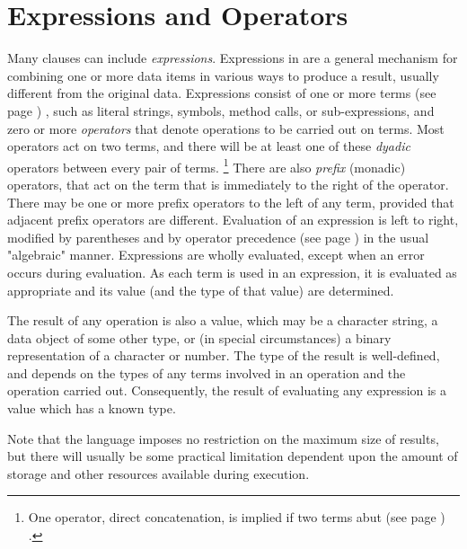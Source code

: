 \chapter{Expressions and Operators}\label{refexpr}
 Many clauses can include \emph{expressions}.  Expressions in \nr{}
are a general mechanism for combining one or more data items in various
ways to produce a result, usually different from the original data.
 Expressions consist of one or more  terms (see page \pageref{refterms}) , such as
literal strings, symbols, method calls, or sub-expressions,
and zero or more \emph{operators} that denote operations to be carried
out on terms.
Most operators act on two terms, and there will be at least one of these
\emph{dyadic} operators between every pair of terms.
\footnote{
One operator, direct concatenation, is implied if two terms
 abut (see page \pageref{refabut}) .
}
There are also \emph{prefix} (monadic) operators, that act on the
term that is immediately to the right of the operator.
There may be one or more prefix operators to the left of any term,
provided that adjacent prefix operators are different.
 Evaluation of an expression is left to right, modified by parentheses
and by  operator precedence (see page \pageref{refpreced})  in the usual
"algebraic" manner.
Expressions are wholly evaluated, except when an error occurs during
evaluation.
 As each term is used in an expression, it is evaluated as
appropriate and its value (and the type of that value) are determined.
 
The result of any operation is also a value, which may be a character
string, a data object of some other type, or (in special circumstances)
a binary representation of a character or number.  The type of the
result is well-defined, and depends on the types of any terms involved
in an operation and the operation carried out.
Consequently, the result of evaluating any expression is a value which
has a known type.
 
Note that the \nr{} language imposes no restriction on the maximum
size of results, but there will usually be some practical limitation
dependent upon the amount of storage and other resources available
during execution.
